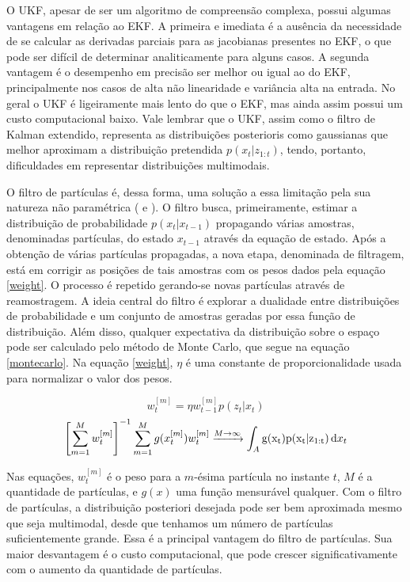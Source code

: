 \documentclass[a4paper,11pt]{article}
\begin{document}
O UKF, apesar de ser um algoritmo de compreensão complexa, possui algumas vantagens em relação ao EKF. A primeira e imediata é a ausência da necessidade de se calcular as derivadas parciais para as jacobianas presentes no EKF, o que pode ser difícil de determinar analiticamente para alguns casos. A segunda vantagem é o desempenho em precisão ser melhor ou igual ao do EKF, principalmente nos casos de alta não linearidade e variância alta na entrada. No geral o UKF é ligeiramente mais lento do que o EKF, mas ainda assim possui um custo computacional baixo. Vale lembrar que o UKF, assim como o filtro de Kalman extendido, representa as distribuições posterioris como gaussianas que melhor aproximam a distribuição pretendida $p(x_t |z_{1:t})$, tendo, portanto, dificuldades em representar distribuições multimodais. 

O filtro de partículas é, dessa forma, uma solução a essa limitação pela sua natureza não paramétrica (\cite{monte_carlo_localization} e \cite{particle_filter}). O filtro busca, primeiramente, estimar a distribuição de probabilidade $p(x_t|x_{t-1})$ propagando várias amostras, denominadas partículas, do estado $x_{t-1}$ através da equação de estado. Após a obtenção de várias partículas propagadas, a nova etapa, denominada de filtragem, está em corrigir as posições de tais amostras com os pesos dados pela equação \eqref{weight}. O processo é repetido gerando-se novas partículas através de reamostragem. A ideia central do filtro é explorar a dualidade entre distribuições de probabilidade e um conjunto de amostras geradas por essa função de distribuição. Além disso, qualquer expectativa da distribuição sobre o espaço pode ser calculado pelo método de Monte Carlo, que segue na equação \eqref{montecarlo}. Na equação \eqref{weight}, $\eta$ é uma constante de proporcionalidade usada para normalizar o valor dos pesos.

\begin{equation}
\label{weight}
w_t^{[m]} = \eta w_{t-1}^{[m]}p(z_t|x_t)
\end{equation}
\begin{equation}
\label{montecarlo}
\small{
\left[\displaystyle\sum_{m=1}^{M} w_t^{[m]}\right]^{-1} \displaystyle\sum_{m=1}^{M} {g(x_t^{[m]})w_t^{[m]}} \xrightarrow[]{M \rightarrow \infty} \int_A \mathrm{g(x_t)p(x_t|z_{1:t})}\,\mathrm{d}x_t}
\end{equation}

Nas equações, $w_t^{[m]}$  é o peso para a $m$-ésima partícula no instante $t$, $M$ é a quantidade de partículas, e $g(x)$ uma função mensurável qualquer. Com o filtro de partículas, a distribuição posteriori desejada pode ser bem aproximada mesmo que seja multimodal, desde que tenhamos um número de partículas suficientemente grande. Essa é a principal vantagem do filtro de partículas. Sua maior desvantagem é o custo computacional, que pode crescer significativamente com o aumento da quantidade de partículas.
\end{document}
